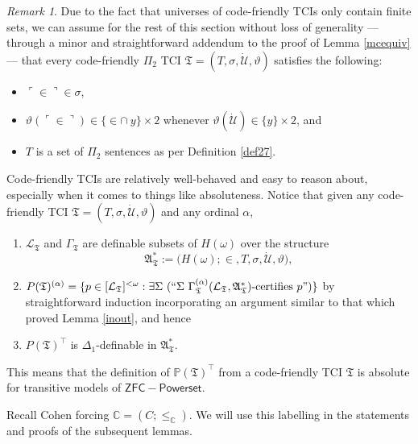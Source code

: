 \documentclass[12pt, twoside]{memoir}
\numberwithin{equation}{section}
\theoremstyle{definition}
\theoremstyle{remark}
\newtheorem{rem}[thm]{Remark}
\theoremstyle{definition}
\theoremstyle{definition}
\theoremstyle{definition}
\theoremstyle{remark}
\begin{document}
\begin{rem}\label{rem6318}
Due to the fact that universes of code-friendly TCIs only contain finite sets, we can assume for the rest of this section without loss of generality --- through a minor and straightforward addendum to the proof of Lemma \ref{mcequiv} --- that every code-friendly $\Pi_2$ TCI $\mathfrak{T} = (T, \sigma, \dot{\mathcal{U}}, \vartheta)$ satisfies the following:
\begin{itemize}
    \item $\ulcorner \in \urcorner \in \sigma$,
    \item $\vartheta(\ulcorner \in \urcorner) \in \{\in \cap \ y\} \times 2$ whenever $\vartheta(\dot{\mathcal{U}}) \in \{y\} \times 2$, and
    \item $T$ is a set of $\Pi_2$ sentences as per Definition \ref{def27}.
\end{itemize}
\end{rem}

Code-friendly TCIs are relatively well-behaved and easy to reason about, especially when it comes to things like absoluteness. Notice that given any code-friendly TCI $\mathfrak{T} = (T, \sigma, \dot{\mathcal{U}}, \vartheta)$ and any ordinal $\alpha$,
\begin{enumerate}[leftmargin=40pt, label=(CF\arabic*)]
    \item\label{cf1} $\mathcal{L}_{\mathfrak{T}}$ and $\Gamma_{\mathfrak{T}}$ are definable subsets of $H(\omega)$ over the structure $$\mathfrak{A}^*_{\mathfrak{T}} := \mathfrak(H(\omega); \in, T, \sigma, \dot{\mathcal{U}}, \vartheta),$$
    \item $P(\mathfrak{T})^{(\alpha)} = \{p \in [\mathcal{L}_{\mathfrak{T}}]^{< \omega} : \exists \Sigma \ (``\Sigma \ \Gamma_{\mathfrak{T}}^{(\alpha)} (\mathcal{L}_{\mathfrak{T}}, \mathfrak{A}^*_{\mathfrak{T}})\text{-certifies } p")\}$ by straightforward induction incorporating an argument similar to that which proved Lemma \ref{inout}, and hence
    \item $P(\mathfrak{T})^{\top}$ is $\Delta_1$-definable in $\mathfrak{A}^*_{\mathfrak{T}}$.
\end{enumerate}
This means that the definition of $\mathbb{P}(\mathfrak{T})^{\top}$ from a code-friendly TCI $\mathfrak{T}$ is absolute for transitive models of $\mathsf{ZFC - Powerset}$.

Recall Cohen forcing $\mathbb{C} = (C; \leq_{\mathbb{C}})$. We will use this labelling in the statements and proofs of the subsequent lemmas.
\end{document}
